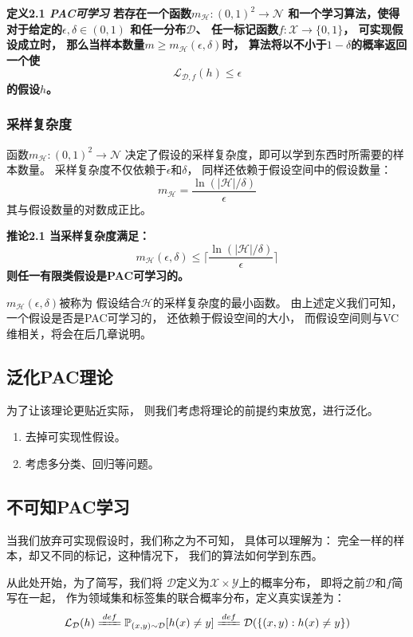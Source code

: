 \documentclass[UTF8]{ctexart}
\begin{document}
\textbf{
定义2.1
\textit{PAC可学习}
若存在一个函数$m_{\mathcal{H}}:{(0,1)}^2\rightarrow\mathcal{N}$
和一个学习算法，使得对于给定的$\epsilon,\delta\in(0,1)$
和任一分布$\mathcal{D}$、
任一标记函数$f:\mathcal{X}\rightarrow\{0,1\}$，
可实现假设成立时，
那么当样本数量$m\geq m_{\mathcal{H}}(\epsilon,\delta)$时，
算法将以不小于$1-\delta$的概率返回一个使
$$\mathcal{L}_{\mathcal{D},f}(h)\leq\epsilon$$
的假设$h$。
}

\subsubsection{采样复杂度}
函数$m_{\mathcal{H}}:(0,1)^2\rightarrow\mathcal{N}$
决定了假设的采样复杂度，即可以学到东西时所需要的样本数量。
采样复杂度不仅依赖于$\epsilon$和$\delta$，
同样还依赖于假设空间中的假设数量：
$$
m_{\mathcal{H}}=\frac{\ln(|\mathcal{H}|/\delta)}{\epsilon}
$$
其与假设数量的对数成正比。

\textbf{
推论2.1
当采样复杂度满足：
$$
m_{\mathcal{H}}(\epsilon,\delta)
\leq\lceil 
\frac{\ln(|\mathcal{H}|/\delta)}{\epsilon}
\rceil
$$
则任一有限类假设是PAC可学习的。
}

$m_{\mathcal{H}}(\epsilon,\delta)$被称为
假设结合$\mathcal{H}$的采样复杂度的最小函数。
由上述定义我们可知，一个假设是否是PAC可学习的，
还依赖于假设空间的大小，
而假设空间则与VC维相关，将会在后几章说明。

\subsection{泛化PAC理论}
为了让该理论更贴近实际，
则我们考虑将理论的前提约束放宽，进行泛化。
\begin{enumerate}
\item 去掉可实现性假设。
\item 考虑多分类、回归等问题。
\end{enumerate}

\subsection{不可知PAC学习}
当我们放弃可实现假设时，我们称之为不可知，
具体可以理解为：
完全一样的样本，却又不同的标记，这种情况下，
我们的算法如何学到东西。

从此处开始，为了简写，我们将
$\mathcal{D}$定义为$\mathcal{X}\times\mathcal{Y}$上的概率分布，
即将之前$\mathcal{D}$和$f$简写在一起，
作为领域集和标签集的联合概率分布，定义真实误差为：
$$
\mathcal{L}_{\mathcal{D}}(h)
\xlongequal{def}
\mathbb{P}_{(x,y)\sim\mathcal{D}}[h(x)\neq y]
\xlongequal{def}
\mathcal{D}(\{(x,y):h(x)\neq y\})
$$
\end{document}
